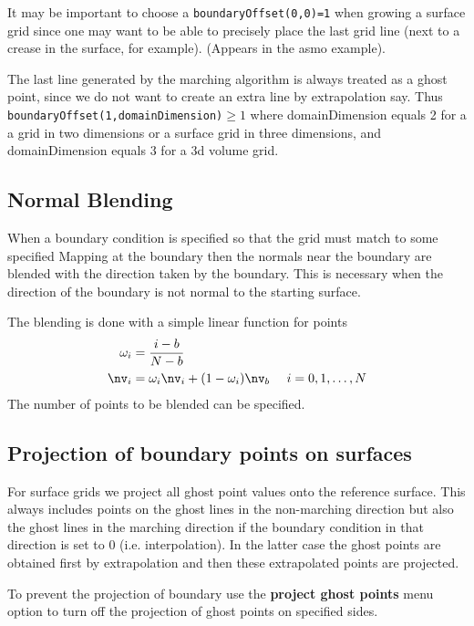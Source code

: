 It may be important to choose a {\tt boundaryOffset(0,0)=1} when growing a surface grid
since one may want to be able to precisely place the last grid line (next to
a crease in the surface, for example). (Appears in the asmo example).

The last line generated by the marching algorithm is always treated as a ghost point, since
we do not want to create an extra line by extrapolation say. Thus 
{\tt boundaryOffset(1,domainDimension)}$\ge1$ where domainDimension equals 2 for a 
a grid in two dimensions or a surface grid in three dimensions, and domainDimension equals
3 for a 3d volume grid.




\subsection{Normal Blending}

   When a boundary condition is specified so that the grid must match
to some specified Mapping at the boundary then the normals near the boundary
are blended with the direction taken by the boundary. This is necessary when the
direction of the boundary is not normal to the starting surface.

The blending is done with a simple linear function for points
\begin{align*}
    \omega_i &= {i-b \over N-b} \\
    \nv_i & = \omega_i \nv_i + (1-\omega_i) \nv_b \mbox{~~~~}i=0,1,\ldots,N \\
\end{align*}
The number of points to be blended can be specified.


\subsection{Projection of boundary points on surfaces}

For surface grids we project all ghost point values onto the reference surface.
This always includes points on the ghost lines in the non-marching direction but also
the ghost lines in the marching direction if the boundary condition in that direction is
set to 0 (i.e. interpolation). In the latter case the ghost points are obtained first by
extrapolation and then these extrapolated points are projected. 

To prevent the projection of boundary use the {\bf project ghost points} menu option to turn
off the projection of ghost points on specified sides.

